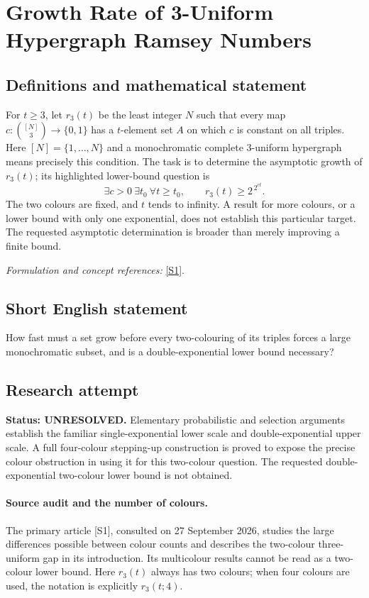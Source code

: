 \documentclass[11pt]{article}
\begin{document}
\section*{\texorpdfstring{Growth Rate of 3-Uniform Hypergraph Ramsey Numbers}{Growth Rate of 3-Uniform Hypergraph Ramsey Numbers}}\label{305}
\subsection{Definitions and mathematical statement}
For $t\ge3$, let $r_3(t)$ be the least integer $N$ such that every map $c:\binom{[N]}3\to\{0,1\}$ has a $t$-element set $A$ on which $c$ is constant on all triples. Here $[N]=\{1,\ldots,N\}$ and a monochromatic complete $3$-uniform hypergraph means precisely this condition. The task is to determine the asymptotic growth of $r_3(t)$; its highlighted lower-bound question is
\[
 \exists c>0\ \exists t_0\ \forall t\ge t_0,
 \qquad r_3(t)\ge 2^{\,2^{ct}}.
\]
The two colours are fixed, and $t$ tends to infinity. A result for more colours, or a lower bound with only one exponential, does not establish this particular target. The requested asymptotic determination is broader than merely improving a finite bound.
\par\smallskip\textit{Formulation and concept references:} \href{https://www.cambridge.org/core/journals/forum-of-mathematics-sigma/article/tower-gaps-in-multicolour-ramsey-numbers/B688491701E6FCC40E202C9B7B3AB672}{[S1]}.

\subsection{Short English statement}
How fast must a set grow before every two-colouring of its triples forces a large monochromatic subset, and is a double-exponential lower bound necessary?
\subsection{Research attempt}
\textbf{Status: UNRESOLVED.} Elementary probabilistic and selection arguments establish the familiar single-exponential lower scale and double-exponential upper scale. A full four-colour stepping-up construction is proved to expose the precise colour obstruction in using it for this two-colour question. The requested double-exponential two-colour lower bound is not obtained.

\paragraph{Source audit and the number of colours.}
The primary article [S1], consulted on 27 September 2026, studies the large differences possible between colour counts and describes the two-colour three-uniform gap in its introduction. Its multicolour results cannot be read as a two-colour lower bound. Here $r_3(t)$ always has two colours; when four colours are used, the notation is explicitly $r_3(t;4)$.
\end{document}
